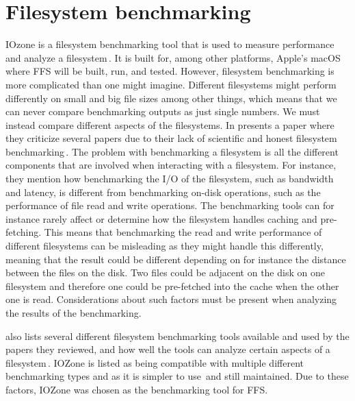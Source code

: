 \section{Filesystem benchmarking}
\label{sec:iozone}
IOzone is a filesystem benchmarking tool that is used to measure performance and analyze a filesystem\,\cite{IozoneFilesystemBenchmark}. It is built for, among other platforms, Apple's macOS where \gls{FFS} will be built, run, and tested. However, filesystem benchmarking is more complicated than one might imagine. Different filesystems might perform differently on small and big file sizes among other things, which means that we can never compare benchmarking outputs as just single numbers. We must instead compare different aspects of the filesystems. In \citeyear{tarasovBenchmarkingFileSystem2011} \citeauthor{tarasovBenchmarkingFileSystem2011} presents a paper where they criticize several papers due to their lack of scientific and honest filesystem benchmarking\,\cite{tarasovBenchmarkingFileSystem2011}. The problem with benchmarking a filesystem is all the different components that are involved when interacting with a filesystem. For instance, they mention how benchmarking the \gls{I/O} of the filesystem, such as bandwidth and latency, is different from benchmarking \mbox{on-disk} operations, such as the performance of file read and write operations. The benchmarking tools can for instance rarely affect or determine how the filesystem handles caching and \mbox{pre-fetching}. This means that benchmarking the read and write performance of different filesystems can be misleading as they might handle this differently, meaning that the result could be different depending on for instance the distance between the files on the disk. Two files could be adjacent on the disk on one filesystem and therefore one could be \mbox{pre-fetched} into the cache when the other one is read. Considerations about such factors must be present when analyzing the results of the benchmarking.

\citeauthor{tarasovBenchmarkingFileSystem2011} also lists several different filesystem benchmarking tools available and used by the papers they reviewed, and how well the tools can analyze certain aspects of a filesystem\,\cite{tarasovBenchmarkingFileSystem2011}. IOZone is listed as being compatible with multiple different benchmarking types and as it is simpler to use\,\cite{agarwalComparingIOBenchmarks2018} and still maintained. Due to these factors, IOZone was chosen as the benchmarking tool for \gls{FFS}.
